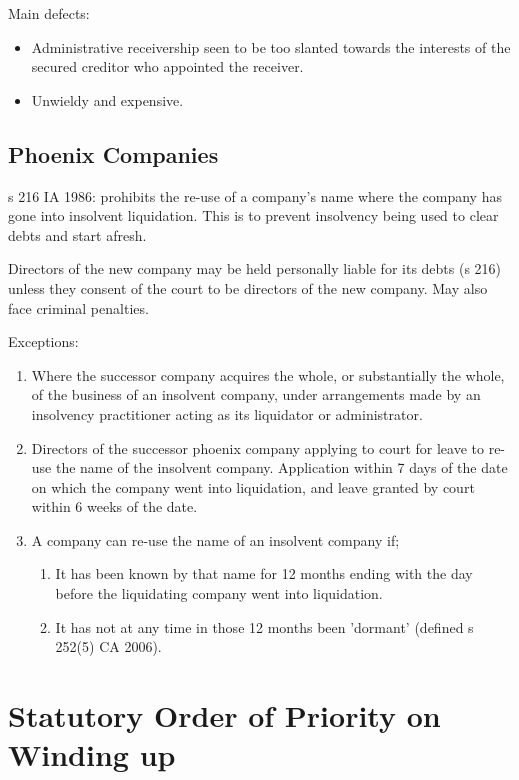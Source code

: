 \documentclass[
]{article}
\providecommand{\tightlist}{%
  \setlength{\itemsep}{0pt}\setlength{\parskip}{0pt}}
\begin{document}
Main defects:

\begin{itemize}
\tightlist
\item
  Administrative receivership seen to be too slanted towards the
  interests of the secured creditor who appointed the receiver.
\item
  Unwieldy and expensive.
\end{itemize}

\hypertarget{phoenix-companies}{%
\subsection{Phoenix Companies}\label{phoenix-companies}}

s 216 IA 1986: prohibits the re-use of a company's name where the
company has gone into insolvent liquidation. This is to prevent
insolvency being used to clear debts and start afresh.

Directors of the new company may be held personally liable for its debts
(s 216) unless they consent of the court to be directors of the new
company. May also face criminal penalties.

Exceptions:

\begin{enumerate}
\tightlist
\item
  Where the successor company acquires the whole, or substantially the
  whole, of the business of an insolvent company, under arrangements
  made by an insolvency practitioner acting as its liquidator or
  administrator.
\item
  Directors of the successor phoenix company applying to court for leave
  to re-use the name of the insolvent company. Application within 7 days
  of the date on which the company went into liquidation, and leave
  granted by court within 6 weeks of the date.
\item
  A company can re-use the name of an insolvent company if;

  \begin{enumerate}
  \tightlist
  \item
    It has been known by that name for 12 months ending with the day
    before the liquidating company went into liquidation.
  \item
    It has not at any time in those 12 months been 'dormant' (defined s
    252(5) CA 2006).
  \end{enumerate}
\end{enumerate}

\hypertarget{statutory-order-of-priority-on-winding-up}{%
\section{Statutory Order of Priority on Winding
up}\label{statutory-order-of-priority-on-winding-up}}
\end{document}
